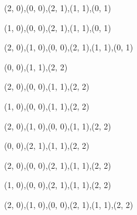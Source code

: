 \begin{figure}[H]
\begin{subfigure}[b]{0.13\textwidth}
{       {{(2, 0),(0, 0),(2, 1),(1, 1),(0, 1)}} {{}}
    }
  \end{subfigure}
  \begin{subfigure}[b]{0.13\textwidth}
    \resizebox{\linewidth}{!} {
       {{(1, 0),(0, 0),(2, 1),(1, 1),(0, 1)}} {{}}
    }
  \end{subfigure}
  \begin{subfigure}[b]{0.13\textwidth}
    \resizebox{\linewidth}{!} {
       {{(2, 0),(1, 0),(0, 0),(2, 1),(1, 1),(0, 1)}} {{}}
    }
  \end{subfigure}
  \begin{subfigure}[b]{0.13\textwidth}
    \resizebox{\linewidth}{!} {
       {{(0, 0),(1, 1),(2, 2)}} {{}}
    }
  \end{subfigure}
  \begin{subfigure}[b]{0.13\textwidth}
    \resizebox{\linewidth}{!} {
       {{(2, 0),(0, 0),(1, 1),(2, 2)}} {{}}
    }
  \end{subfigure}
  \begin{subfigure}[b]{0.13\textwidth}
    \resizebox{\linewidth}{!} {
       {{(1, 0),(0, 0),(1, 1),(2, 2)}} {{}}
    }
  \end{subfigure}
  \begin{subfigure}[b]{0.13\textwidth}
    \resizebox{\linewidth}{!} {
       {{(2, 0),(1, 0),(0, 0),(1, 1),(2, 2)}} {{}}
    }
  \end{subfigure}
  \begin{subfigure}[b]{0.13\textwidth}
    \resizebox{\linewidth}{!} {
       {{(0, 0),(2, 1),(1, 1),(2, 2)}} {{}}
    }
  \end{subfigure}
  \begin{subfigure}[b]{0.13\textwidth}
    \resizebox{\linewidth}{!} {
       {{(2, 0),(0, 0),(2, 1),(1, 1),(2, 2)}} {{}}
    }
  \end{subfigure}
  \begin{subfigure}[b]{0.13\textwidth}
    \resizebox{\linewidth}{!} {
       {{(1, 0),(0, 0),(2, 1),(1, 1),(2, 2)}} {{}}
    }
  \end{subfigure}
  \begin{subfigure}[b]{0.13\textwidth}
    \resizebox{\linewidth}{!} {
       {{(2, 0),(1, 0),(0, 0),(2, 1),(1, 1),(2, 2)}} {{}}
    }
  \end{subfigure}
  \begin{subfigure}[b]{0.13\textwidth}

\end{subfigure}
\end{figure}
